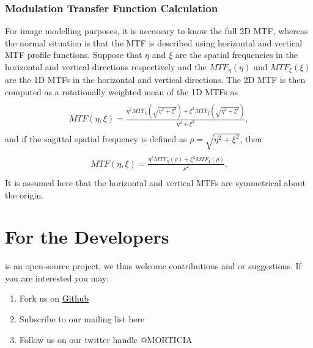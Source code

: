 \documentclass[a4paper,10pt,english]{sphinxmanual}
\begin{document}
\subsection{Modulation Transfer Function Calculation}
\label{styleguide:modulation-transfer-function-calculation}
For image modelling purposes, it is necessary to know the full 2D MTF, whereas the normal situation is that the
MTF is described using horizontal and vertical MTF profile functions. Suppose that \(\eta\) and \(\xi\) are
the spatial frequencies in the horizontal and vertical directions respectively and the \(M\!T\!F_\eta(\eta)\) and
\(M\!T\!F_\xi(\xi)\) are the 1D MTFs in the horizontal and vertical directions. The 2D MTF is then computed as
a rotationally weighted mean of the 1D MTFs as
\begin{align*}\begin{aligned}
\begin{split}M\!T\!F(\eta,\xi)=\frac{\eta^{2}M\!T\!F_{\eta}\left(\sqrt{\eta^{2}+\xi^{2}}\right)+\xi^{2}M\!T\!F_{\xi}\left(\sqrt{\eta^{2}+\xi^{2}}\right)}{\eta^{2}+\xi^{2}},\end{split}\end{aligned}\end{align*}
and if the sagittal spatial frequency is defined as \(\rho=\sqrt{\eta^{2}+\xi^{2}}\), then
\begin{align*}\begin{aligned}
\begin{split}M\!T\!F(\eta,\xi)=\frac{\eta^{2}M\!T\!F_{\eta}\left(\rho\right)+\xi^{2}M\!T\!F_{\xi}\left(\rho\right)}{\rho^{2}}.\end{split}\end{aligned}\end{align*}
It is assumed here that the horizontal and vertical MTFs are symmetrical about the origin.


\chapter{For the Developers}
\label{for_developers:for-the-developers}\label{for_developers::doc}
 is an open-source project, we thus welcome contributions and or suggestions. If you are interested you may:
\begin{enumerate}
\item {} 
Fork us on \href{https://github.com/derekjgriffith/MORTICIA}{Github}

\item {} 
Subscribe to our mailing list here

\item {} 
Follow us on our twitter handle @MORTICIA

\end{enumerate}
\end{document}
